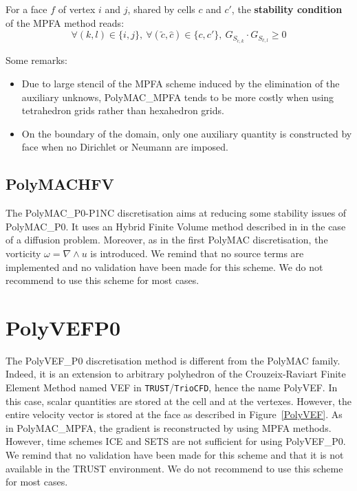 For a face $f$ of vertex $i$ and $j$, shared by cells $c$ and $c'$, the \textbf{stability condition} of the MPFA method reads:
\begin{equation}
    \forall (k,l) \in \{i,j\}, \ \forall (\tilde{c},\hat{c})\in \{c,c' \}, \ G_{S_{\tilde{c},k}} \cdot G_{S_{\hat{c},l}} \geq 0 \label{MPFA_stability_cdt}
\end{equation}

Some remarks:
{
\it
\begin{itemize} 
    \item  Due to large stencil of the MPFA scheme induced by the elimination of the auxiliary unknows, PolyMAC\_MPFA tends to be more costly when using tetrahedron grids rather than hexahedron grids.
    \item  On the boundary of the domain, only one auxiliary quantity is constructed by face when no Dirichlet or Neumann are imposed. 
\end{itemize}
}

\subsection{PolyMAC\textunderscore{}HFV}
The PolyMAC\_P0-P1NC discretisation aims at reducing some stability issues of PolyMAC\_P0. It uses an Hybrid Finite Volume method described in \cite{eymard2007} in the case of a diffusion problem. Moreover, as in the first PolyMAC discretisation, the vorticity $\omega = \nabla \wedge u$ is introduced. We remind that no source terms are implemented and no validation have been made for this scheme. We do not recommend to use this scheme for most cases.

\section{PolyVEF\textunderscore{}P0\label{sec:polyvef}}
The PolyVEF\_P0 discretisation method is different from the PolyMAC family. Indeed, it is an extension to arbitrary polyhedron of the Crouzeix-Raviart Finite Element Method named VEF in \texttt{TRUST}/\texttt{TrioCFD}, hence the name PolyVEF. In this case, scalar quantities are stored at the cell and at the vertexes. However, the entire velocity vector is stored at the face as described in Figure~\ref{PolyVEF}. As in PolyMAC\_MPFA, the gradient is reconstructed by using MPFA methods. 
However, time schemes ICE and SETS are not sufficient for using PolyVEF\_P0. We remind that no validation have been made for this scheme and that it is not available in the TRUST environment. We do not recommend to use this scheme for most cases.

